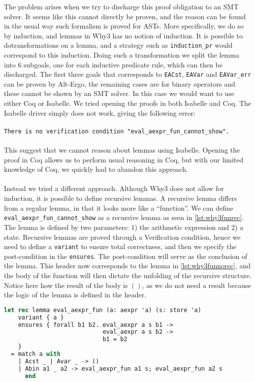 The problem arises when we try to discharge this proof obligation to an SMT solver.
It seems like this cannot directly be proven, and the reason can be found in the usual way such formalism is proved for ASTs.
More specifically, we do so by induction, and lemmas in Why3 has no notion of induction.
It is possible to dotransformations on a lemma, and a strategy such as \texttt{induction_pr} would correspond to this induction.
Doing such a transformation we split the lemma into 6 subgoals, one for each inductive predicate rule, which can then be discharged.
The first three goals that corresponds to \texttt{EACst}, \texttt{EAVar} and \texttt{EAVar\_err} can be proven by Alt-Ergo, the remaining cases are for binary operators and these cannot be shown by an SMT solver.
In this case we would want to use either Coq or Isabelle. We tried opening the proofs in both Isabelle and Coq.
The Isabelle driver simply does not work, giving the following error:
\\~\\
\texttt{There is no verification condition "eval\_aexpr\_fun\_cannot\_show".}
\\~\\
This suggest that we cannot reason about lemmas using Isabelle.
Opening the proof in Coq allows us to perform usual reasoning in Coq, but with our limited knowledge of Coq, we quickly had to abandon this approach.
\\~\\
Instead we tried a different approach. Although Why3 does not allow for induction, it is possible to define
recursive lemmas. A recursive lemma differs from a regular lemma, in that it looks more like a ``function''.
We can define \texttt{eval_aexpr_fun_cannot_show} as a recursive lemma as seen in \autoref{lst:why3funrec}.
The lemma is defined by two parameters: 1) the arithmetic expression and 2) a state.
Recursive lemmas are proved through a Verification condition,
hence we need to define a \texttt{variant} to ensure total correctness,
and then we specify the post-condition in the \texttt{ensures}.
The post-condition will serve as the conclusion of the lemma.
This header now corresponds to the lemma in \autoref{lst:why3funnorec}, and the body of the function will then dictate the unfolding of the recursive structure.
Notice here how the result of the body is $()$, as we do not need a result because the logic
of the lemma is defined in the header.

\begin{lstlisting}[caption={Recursive lemma for functional arithmetic expressions},label={lst:why3funrec},language=sml]
let rec lemma eval_aexpr_fun (a: aexpr 'a) (s: store 'a)
    variant { a }
    ensures { forall b1 b2. eval_aexpr a s b1 ->
                            eval_aexpr a s b2 ->
                            b1 = b2
    }
  = match a with
    | Acst _ | Avar _ -> ()
    | Abin a1 _ a2 -> eval_aexpr_fun a1 s; eval_aexpr_fun a2 s
      end
\end{lstlisting}


